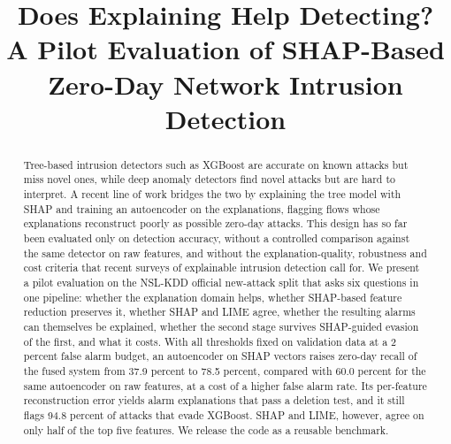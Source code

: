 \documentclass[conference]{IEEEtran}
\begin{document}
\title{Does Explaining Help Detecting? A Pilot Evaluation of SHAP-Based Zero-Day Network Intrusion Detection}

\author{
\and
{}
\and
{}
}

\maketitle

\begin{abstract}
Tree-based intrusion detectors such as XGBoost are accurate on known attacks but miss novel ones, while deep anomaly detectors find novel attacks but are hard to interpret. A recent line of work bridges the two by explaining the tree model with SHAP and training an autoencoder on the explanations, flagging flows whose explanations reconstruct poorly as possible zero-day attacks. This design has so far been evaluated only on detection accuracy, without a controlled comparison against the same detector on raw features, and without the explanation-quality, robustness and cost criteria that recent surveys of explainable intrusion detection call for. We present a pilot evaluation on the NSL-KDD official new-attack split that asks six questions in one pipeline: whether the explanation domain helps, whether SHAP-based feature reduction preserves it, whether SHAP and LIME agree, whether the resulting alarms can themselves be explained, whether the second stage survives SHAP-guided evasion of the first, and what it costs. With all thresholds fixed on validation data at a 2 percent false alarm budget, an autoencoder on SHAP vectors raises zero-day recall of the fused system from 37.9 percent to 78.5 percent, compared with 60.0 percent for the same autoencoder on raw features, at a cost of a higher false alarm rate. Its per-feature reconstruction error yields alarm explanations that pass a deletion test, and it still flags 94.8 percent of attacks that evade XGBoost. SHAP and LIME, however, agree on only half of the top five features. We release the code as a reusable benchmark.
\end{abstract}
\end{document}
